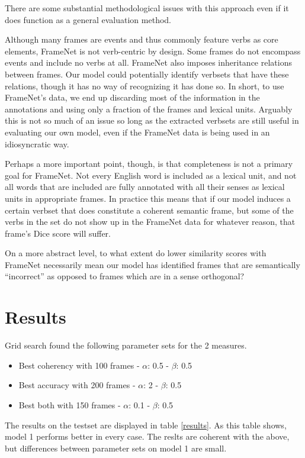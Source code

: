 \documentclass{article} %
\begin{document}
There are some substantial methodological issues with this approach even if it does function as a general evaluation method. 

Although many frames are events and thus commonly feature verbs as core elements, FrameNet is not verb-centric by design. Some frames do not encompass events and include no verbs at all.
FrameNet also imposes inheritance relations between frames. Our model could potentially identify verbsets that have these relations, though it has no way of recognizing it has done so.
In short, to use FrameNet's data, we end up discarding most of the information in the annotations and using only a fraction of the frames and lexical units. Arguably this is not so much of an issue so long as the extracted verbsets are still useful in evaluating our own model, even if the FrameNet data is being used in an idiosyncratic way.

Perhaps a more important point, though, is that completeness is not a primary goal for FrameNet. Not every English word is included as a lexical unit, and not all words that are included are fully annotated with all their senses as lexical units in appropriate frames.
In practice this means that if our model induces a certain verbset that does constitute a coherent semantic frame, but some of the verbs in the set do not show up in the FrameNet data for whatever reason, that frame's Dice score will suffer.
% 




On a more abstract level, to what extent do lower similarity scores with FrameNet necessarily mean our model has identified frames that are semantically ``incorrect'' as opposed to frames which are in a sense orthogonal?





\section{Results}
Grid search found the following parameter sets for the 2 measures. 
\begin{itemize}
  \item Best coherency with 100 frames - $\alpha$: 0.5 - $\beta$: 0.5
  \item Best accuracy with 200 frames - $\alpha$: 2 - $\beta$: 0.5
  \item Best both with 150 frames - $\alpha$: 0.1 - $\beta$: 0.5
\end{itemize}
The results on the testset are displayed in table \ref{results}. As this table shows, model 1 performs better in every case. The reslts are coherent with the above, but differences between parameter sets on model 1 are small.
\end{document}
